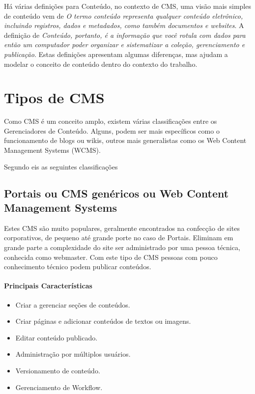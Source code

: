 Há várias definições para Conteúdo, no contexto de CMS, uma visão mais simples de conteúdo vem de \cite{ecm_paper} \emph{O termo conteúdo representa qualquer conteúdo eletrônico, incluindo registros, dados e metadados, como também documentos e websites}. 
A definição de \cite{cms_bible} \emph{Conteúdo, portanto, é a informação que você rotula com dados para então um computador poder organizar e sistematizar a coleção, gerenciamento e publicação}. Estas definições apresentam algumas diferenças, mas ajudam a modelar o conceito de conteúdo dentro do contexto do trabalho.

\section{Tipos de CMS}

Como CMS é um conceito amplo, existem várias classificações entre os Gerenciadores de Conteúdo. Alguns, podem ser mais específicos como o funcionamento de blogs ou wikis, outros mais generalistas como os Web Content Management Systems (WCMS).

Segundo \cite{choosing_open_source_cms} eis as seguintes classificações

\subsection{Portais ou CMS genéricos ou Web Content Management Systems} 

Estes CMS são muito populares, geralmente encontrados na confecção de sites corporativos, de pequeno até grande porte no caso de Portais. Eliminam em grande parte a complexidade do site ser administrado por uma pessoa técnica, conhecida como webmaster. Com este tipo de CMS pessoas com pouco conhecimento técnico podem publicar conteúdos.

\paragraph{Principais Características}

\begin{itemize}
  \item Criar a gerenciar seções de conteúdos.
  \item Criar páginas e adicionar conteúdos de textos ou imagens.
  \item Editar conteúdo publicado.
  \item Administração por múltiplos usuários.
  \item Versionamento de conteúdo.
  \item Gerenciamento de Workflow.
\end{itemize}

